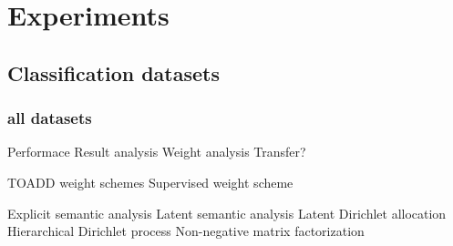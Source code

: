 \chapter{Experiments}
    \section{Classification datasets}
        \subsection{all datasets}

    Performace
    Result analysis
    Weight analysis
    Transfer?



TOADD
weight schemes
Supervised weight scheme


Explicit semantic analysis
Latent semantic analysis
Latent Dirichlet allocation
Hierarchical Dirichlet process
Non-negative matrix factorization
